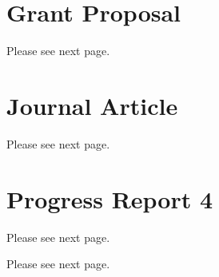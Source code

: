 \documentclass[12pt,letterpaper,english,bibliography=totocnumbered, abstract=on]{scrartcl}
\begin{document}
\newpage
\begin{appendices}

\section{Grant Proposal}
Please see next page.
\label{appA}


\newpage
\section{Journal Article}
\label{appB}
Please see next page.


\newpage
\section{Progress Report 4}
\label{appC}
Please see next page.


Please see next page.

\end{appendices}
\end{document}

